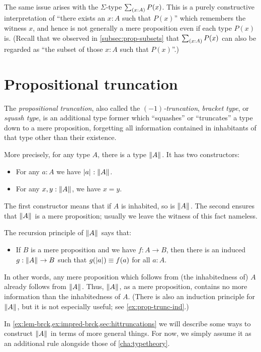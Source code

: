 %
The same issue arises with the $\Sigma$-type $\sm{x:A} P(x)$.
This is a purely constructive interpretation of ``there exists an $x:A$ such that $P(x)$'' which remembers the witness $x$, and hence is not generally a mere proposition even if each type $P(x)$ is.
(Recall that we observed in \autoref{subsec:prop-subsets} that $\sm{x:A} P(x)$ can also be regarded as ``the subset of those $x:A$ such that $P(x)$''.)


\section{Propositional truncation}
\label{subsec:prop-trunc}

%
The \emph{propositional truncation}, also called the \emph{$(-1)$-truncation}, \emph{bracket type}, or \emph{squash type}, is an additional type former which ``squashes'' or ``truncates'' a type down to a mere proposition, forgetting all information contained in inhabitants of that type other than their existence.

More precisely, for any type $A$, there is a type $\mathopen{}\left\Vert A\right\Vert_{}\mathclose{}$.
It has two constructors:
\begin{itemize}
\item For any $a:A$ we have $\mathopen{}\left|a\right|_{}^{}\mathclose{} : \mathopen{}\left\Vert A\right\Vert_{}\mathclose{}$.
\item For any $x,y:\mathopen{}\left\Vert A\right\Vert_{}\mathclose{}$, we have $x=y$.
\end{itemize}
The first constructor means that if $A$ is inhabited, so is $\mathopen{}\left\Vert A\right\Vert_{}\mathclose{}$.
The second ensures that $\mathopen{}\left\Vert A\right\Vert_{}\mathclose{}$ is a mere proposition; usually we leave the witness of this fact nameless.

The recursion principle of $\mathopen{}\left\Vert A\right\Vert_{}\mathclose{}$ says that:
\begin{itemize}
\item If $B$ is a mere proposition and we have $f:A\to B$, then there is an induced $g:\mathopen{}\left\Vert A\right\Vert_{}\mathclose{} \to B$ such that $g(\mathopen{}\left|a\right|_{}^{}\mathclose{}) \equiv f(a)$ for all $a:A$.
\end{itemize}
In other words, any mere proposition which follows from (the inhabitedness of) $A$ already follows from $\mathopen{}\left\Vert A\right\Vert_{}\mathclose{}$.
Thus, $\mathopen{}\left\Vert A\right\Vert_{}\mathclose{}$, as a mere proposition, contains no more information than the inhabitedness of $A$.
(There is also an induction principle for $\mathopen{}\left\Vert A\right\Vert_{}\mathclose{}$, but it is not especially useful; see \autoref{ex:prop-trunc-ind}.)

In \autoref{ex:lem-brck,ex:impred-brck,sec:hittruncations} we will describe some ways to construct $\mathopen{}\left\Vert A\right\Vert_{}\mathclose{}$ in terms of more general things.
For now, we simply assume it as an additional rule alongside those of \autoref{cha:typetheory}.

